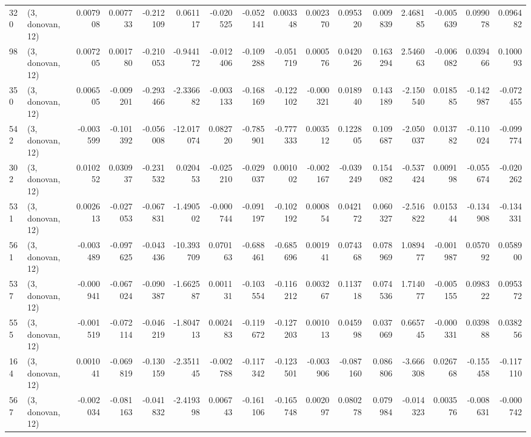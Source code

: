 \begin{tabular}{llrrrrrrrrrrrrrr}
320 &  (3, donovan, 12) &   0.007908 &  0.007733 & -0.212109 &    0.061117 & -0.020525 &  -0.052141 &  0.003348 &  0.002370 &  0.095320 &  0.009839 &    2.468185 & -0.005639 &  0.099078 &  0.096482 \\
98  &  (3, donovan, 12) &   0.007205 &  0.001780 & -0.210053 &   -0.944172 & -0.012406 &  -0.109288 & -0.051719 &  0.000576 &  0.042026 &  0.163294 &    2.546063 & -0.006082 &  0.039466 &  0.100093 \\
350 &  (3, donovan, 12) &   0.006505 & -0.009201 & -0.293466 &   -2.336682 & -0.003133 &  -0.168169 & -0.122102 & -0.000321 &  0.018940 &  0.143189 &   -2.150540 &  0.018585 & -0.142987 & -0.072455 \\
542 &  (3, donovan, 12) &  -0.003599 & -0.101392 & -0.056008 &  -12.017074 &  0.082720 &  -0.785901 & -0.777333 &  0.003512 &  0.122805 &  0.109687 &   -2.050037 &  0.013782 & -0.110024 & -0.099774 \\
302 &  (3, donovan, 12) &   0.010252 &  0.030937 & -0.231532 &    0.020453 & -0.025210 &  -0.029037 &  0.001002 & -0.002167 & -0.039249 &  0.154082 &   -0.537424 &  0.009198 & -0.055674 & -0.020262 \\
531 &  (3, donovan, 12) &   0.002613 & -0.027053 & -0.067831 &   -1.490502 & -0.000744 &  -0.091197 & -0.102192 &  0.000854 &  0.042172 &  0.060327 &   -2.516822 &  0.015344 & -0.134908 & -0.134331 \\
561 &  (3, donovan, 12) &  -0.003489 & -0.097625 & -0.043436 &  -10.393709 &  0.070163 &  -0.688461 & -0.685696 &  0.001941 &  0.074368 &  0.078969 &    1.089477 & -0.001987 &  0.057092 &  0.058900 \\
537 &  (3, donovan, 12) &  -0.000941 & -0.067024 & -0.090387 &   -1.662587 &  0.001131 &  -0.103554 & -0.116212 &  0.003267 &  0.113718 &  0.074536 &    1.714077 & -0.005155 &  0.098322 &  0.095372 \\
555 &  (3, donovan, 12) &  -0.001519 & -0.072114 & -0.046219 &   -1.804713 &  0.002483 &  -0.119672 & -0.127203 &  0.001013 &  0.045998 &  0.037069 &    0.665745 & -0.000331 &  0.039888 &  0.038256 \\
164 &  (3, donovan, 12) &   0.001041 & -0.069819 & -0.130159 &   -2.351145 & -0.002788 &  -0.117342 & -0.123501 & -0.003906 & -0.087160 &  0.086806 &   -3.666308 &  0.026768 & -0.155458 & -0.117110 \\
567 &  (3, donovan, 12) &  -0.002034 & -0.081163 & -0.041832 &   -2.419398 &  0.006743 &  -0.161106 & -0.165748 &  0.002097 &  0.080278 &  0.079984 &   -0.014323 &  0.003576 & -0.008631 & -0.000742 \\

\end{tabular}
